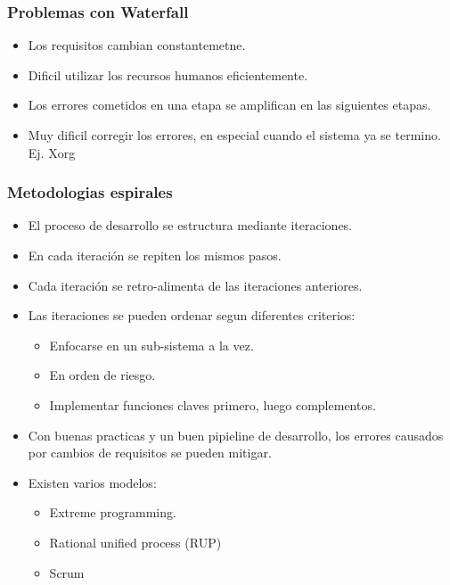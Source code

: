 \documentclass{beamer}
\begin{document}
\begin{frame}
    \frametitle{Problemas con Waterfall}
    \begin{itemize}
        \item{Los requisitos cambian constantemetne.}
        \item{Dificil utilizar los recursos humanos eficientemente.}
        \item{Los errores cometidos en una etapa se amplifican
        en las siguientes etapas.}
        \item{Muy dificil corregir los errores, en especial
        cuando el sistema ya se termino. Ej. Xorg}
    \end{itemize}
\end{frame}

\begin{frame}
    \frametitle{Metodologias espirales}
    \begin{itemize}
        \item{El proceso de desarrollo se estructura mediante iteraciones.}
        \item{En cada iteraci\'on se repiten los mismos pasos.}
        \item{Cada iteraci\'on se retro-alimenta de las iteraciones anteriores.}
        \item{Las iteraciones se pueden ordenar segun diferentes criterios:
            \begin{itemize}
                \item{Enfocarse en un sub-sistema a la vez.}
                \item{En orden de riesgo.}
                \item{Implementar funciones claves primero, luego complementos.}
            \end{itemize}
        }
        \item{Con buenas practicas y un buen pipieline de desarrollo, los
        errores causados por cambios de requisitos se pueden mitigar.}
        \item{Existen varios modelos\cite{ScrumAgile}:
            \begin{itemize}
                \item{Extreme programming.}
                \item{Rational unified process (RUP)}
                \item{Scrum}
            \end{itemize}
        }
    \end{itemize}
\end{frame}
\end{document}

